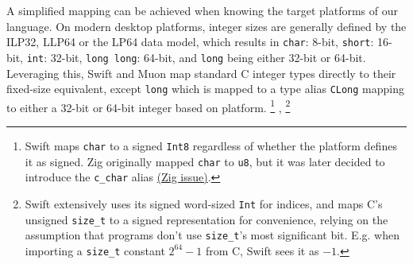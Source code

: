 A simplified mapping can be achieved when knowing the target platforms of our language. On modern desktop platforms, integer sizes are generally defined by the ILP32, LLP64 or the LP64 data model, which results in \texttt{char}: 8-bit, \texttt{short}: 16-bit, \texttt{int}: 32-bit, \texttt{long long}: 64-bit, and \texttt{long} being either 32-bit or 64-bit. Leveraging this, Swift and Muon map standard C integer types directly to their fixed-size equivalent, except \texttt{long} which is mapped to a type alias \texttt{CLong} mapping to either a 32-bit or 64-bit integer based on platform.
\footnote{
    Swift maps \texttt{char} to a signed \texttt{Int8} regardless of whether the platform defines it as signed. Zig originally mapped \texttt{char} to \texttt{u8}, but it was later decided to introduce the \texttt{c\_char} alias 
    \href{https://github.com/ziglang/zig/issues/875}{(Zig issue)}. %
}
,
\footnote{
    Swift extensively uses its signed word-sized \texttt{Int} for indices, and maps C's unsigned \texttt{size\_t} to a signed representation for convenience, relying on the assumption that programs don't use \texttt{size\_t}'s most significant bit. E.g. when importing a \texttt{size\_t} constant $2^{64} -1$ from C, Swift sees it as $-1$.
}


